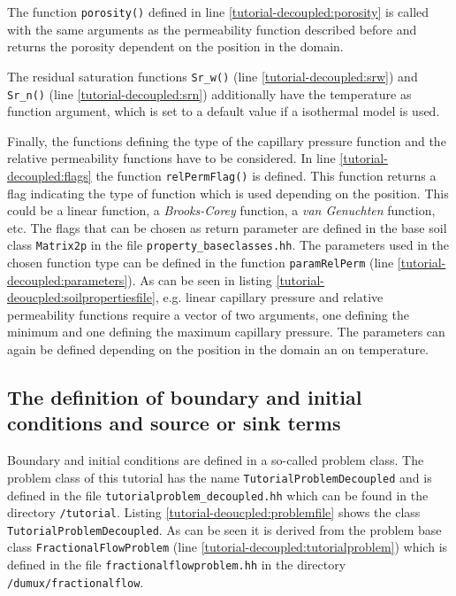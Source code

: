 The function \texttt{porosity()} defined in line \ref{tutorial-decoupled:porosity} is called with the same arguments as the permeability function described before and returns the porosity dependent on the position in the domain.

The residual saturation functions \texttt{Sr\_w()} (line \ref{tutorial-decoupled:srw}) and \texttt{Sr\_n()} (line \ref{tutorial-decoupled:srn}) additionally have the temperature as function argument, which is set to a default value if a isothermal model is used.

Finally, the functions defining the type of the capillary pressure function and the relative permeability functions have to be considered. In line \ref{tutorial-decoupled:flags} the function \texttt{relPermFlag()} is defined. This function returns a flag indicating the type of function which is used depending on the position. This could be a linear function, a \textit{Brooks-Corey} function, a \textit{van Genuchten} function, etc. The flags that can be chosen as return parameter are defined in the base soil class \texttt{Matrix2p} in the file \texttt{property\_baseclasses.hh}. The parameters used in the chosen function type can be defined in the function \texttt{paramRelPerm} (line \ref{tutorial-decoupled:parameters}). As can be seen in listing \ref{tutorial-deoucpled:soilpropertiesfile}, e.g. linear capillary pressure and relative permeability functions require a vector of two arguments, one defining the minimum and one defining the maximum capillary pressure. The parameters can again be defined depending on the position in the domain an on temperature.

\subsection{The definition of boundary and initial conditions and source or sink terms}\label{tutorial-decoupled:description-bc-ic}

Boundary and initial conditions are defined in a so-called problem class. The problem class of this tutorial has the name \texttt{TutorialProblemDecoupled} and is defined in the file \texttt{tutorialproblem\_decoupled.hh} which can be found in the directory \texttt{/tutorial}. Listing \ref{tutorial-deoucpled:problemfile} shows the class \texttt{TutorialProblemDecoupled}. As can be seen it is derived from the problem base class \texttt{FractionalFlowProblem} (line \ref{tutorial-decoupled:tutorialproblem}) which is defined in the file \texttt{fractionalflowproblem.hh} in the directory \texttt{/dumux/fractionalflow}. 

